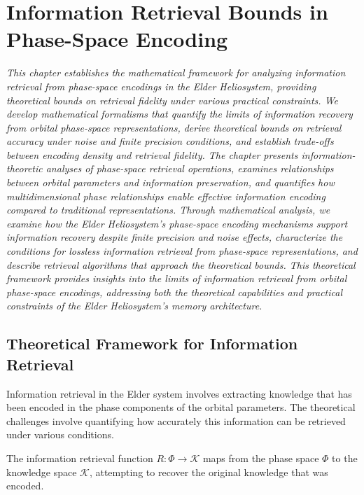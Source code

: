 \chapter{Information Retrieval Bounds in Phase-Space Encoding}

\textit{This chapter establishes the mathematical framework for analyzing information retrieval from phase-space encodings in the Elder Heliosystem, providing theoretical bounds on retrieval fidelity under various practical constraints. We develop mathematical formalisms that quantify the limits of information recovery from orbital phase-space representations, derive theoretical bounds on retrieval accuracy under noise and finite precision conditions, and establish trade-offs between encoding density and retrieval fidelity. The chapter presents information-theoretic analyses of phase-space retrieval operations, examines relationships between orbital parameters and information preservation, and quantifies how multidimensional phase relationships enable effective information encoding compared to traditional representations. Through mathematical analysis, we examine how the Elder Heliosystem's phase-space encoding mechanisms support information recovery despite finite precision and noise effects, characterize the conditions for lossless information retrieval from phase-space representations, and describe retrieval algorithms that approach the theoretical bounds. This theoretical framework provides insights into the limits of information retrieval from orbital phase-space encodings, addressing both the theoretical capabilities and practical constraints of the Elder Heliosystem's memory architecture.}

\section{Theoretical Framework for Information Retrieval}

Information retrieval in the Elder system involves extracting knowledge that has been encoded in the phase components of the orbital parameters. The theoretical challenges involve quantifying how accurately this information can be retrieved under various conditions.

\begin{definition}
The information retrieval function $R: \Phi \rightarrow \mathcal{K}$ maps from the phase space $\Phi$ to the knowledge space $\mathcal{K}$, attempting to recover the original knowledge that was encoded.
\end{definition}

